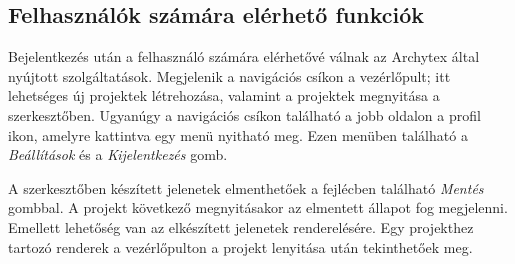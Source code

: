 \subsection{Felhasználók számára elérhető funkciók}
Bejelentkezés után a felhasználó számára elérhetővé válnak az Archytex által nyújtott szolgáltatások. Megjelenik a navigációs csíkon a vezérlőpult; itt lehetséges új projektek létrehozása, valamint a projektek megnyitása a szerkesztőben. Ugyanúgy a navigációs csíkon található a jobb oldalon a profil ikon, amelyre kattintva egy menü nyitható meg. Ezen menüben található a \emph{Beállítások} és a \emph{Kijelentkezés} gomb.

A szerkesztőben készített jelenetek elmenthetőek a fejlécben található \emph{Mentés} gombbal. A projekt következő megnyitásakor az elmentett állapot fog megjelenni. Emellett lehetőség van az elkészített jelenetek renderelésére. Egy projekthez tartozó renderek a vezérlőpulton a projekt lenyitása után tekinthetőek meg.
